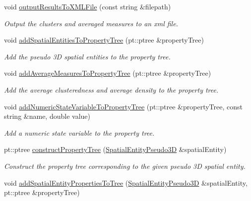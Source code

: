 \begin{DoxyCompactItemize}
void \hyperlink{classmultiscale_1_1analysis_1_1Detector_a9f5690049f55799ac7a2741e97de679e}{output\-Results\-To\-X\-M\-L\-File} (const string \&filepath)
\begin{DoxyCompactList}\small\item\em Output the clusters and averaged measures to an xml file. \end{DoxyCompactList}\item 
void \hyperlink{classmultiscale_1_1analysis_1_1Detector_a11bf4fa46f51ac033b635d19e92998ae}{add\-Spatial\-Entities\-To\-Property\-Tree} (pt\-::ptree \&property\-Tree)
\begin{DoxyCompactList}\small\item\em Add the pseudo 3\-D spatial entities to the property tree. \end{DoxyCompactList}\item 
void \hyperlink{classmultiscale_1_1analysis_1_1Detector_a9cfa8c84d6cb13bf6d423b1db490668d}{add\-Average\-Measures\-To\-Property\-Tree} (pt\-::ptree \&property\-Tree)
\begin{DoxyCompactList}\small\item\em Add the average clusteredness and average density to the property tree. \end{DoxyCompactList}\item 
void \hyperlink{classmultiscale_1_1analysis_1_1Detector_aceaf8e69b2ce5d4d24a5c6e4debb296d}{add\-Numeric\-State\-Variable\-To\-Property\-Tree} (pt\-::ptree \&property\-Tree, const string \&name, double value)
\begin{DoxyCompactList}\small\item\em Add a numeric state variable to the property tree. \end{DoxyCompactList}\item 
pt\-::ptree \hyperlink{classmultiscale_1_1analysis_1_1Detector_af11495dceabe108397805a770fb9c7b4}{construct\-Property\-Tree} (\hyperlink{classmultiscale_1_1analysis_1_1SpatialEntityPseudo3D}{Spatial\-Entity\-Pseudo3\-D} \&spatial\-Entity)
\begin{DoxyCompactList}\small\item\em Construct the property tree corresponding to the given pseudo 3\-D spatial entity. \end{DoxyCompactList}\item 
void \hyperlink{classmultiscale_1_1analysis_1_1Detector_ac0e3077d43c329e409db504bf3981c3c}{add\-Spatial\-Entity\-Properties\-To\-Tree} (\hyperlink{classmultiscale_1_1analysis_1_1SpatialEntityPseudo3D}{Spatial\-Entity\-Pseudo3\-D} \&spatial\-Entity, pt\-::ptree \&property\-Tree)

\end{DoxyCompactItemize}
